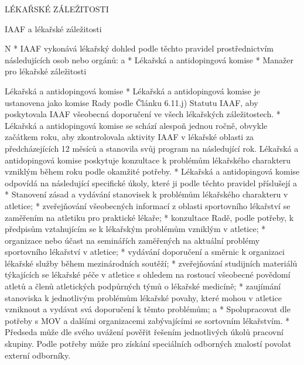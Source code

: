 \sec LÉKAŘSKÉ ZÁLEŽITOSTI

\secc IAAF a lékařské záležitosti

\begitems \style N
* IAAF vykonává lékařský dohled podle těchto pravidel prostřednictvím následujících osob nebo orgánů:
  \begitems \style a
  * Lékařská a antidopingová komise
  * Manažer pro lékařské záležitosti
  \enditems

Lékařská a antidopingová komise
* Lékařská a antidopingová komise je ustanovena jako komise Rady podle Článku 6.11.j) Statutu IAAF, aby poskytovala IAAF všeobecná doporučení ve všech  lékařských záležitostech.
* Lékařská a antidopingová komise se schází alespoň jednou ročně, obvykle začátkem roku, aby zkontrolovala aktivity IAAF v lékařské oblasti za předcházejících 12 měsíců a stanovila svůj program na následující rok. Lékařská a antidopingová komise poskytuje konzultace k problémům lékařského charakteru vzniklým během roku podle okamžité potřeby.
* Lékařská a antidopingová komise odpovídá na následující specifické úkoly, které ji podle těchto pravidel příslušejí
  \begitems \style a
  * Stanovení zásad a vydávání stanovisek k problémům lékařského charakteru v atletice;
  * zveřejňování všeobecných informací z oblasti sportovního lékařství se zaměřením na atletiku pro praktické lékaře;
  * konzultace Radě, podle potřeby, k předpisům vztahujícím se k  lékařským problémům vzniklým v atletice;
  * organizace nebo účast na seminářích zaměřených na aktuální problémy sportovního lékařství v atletice;
  * vydávání doporučení a směrnic k organizaci lékařské služby během mezinárodních soutěží;
  * zveřejňování studijních materiálů týkajících se lékařské péče v atletice s ohledem na rostoucí všeobecné povědomí atletů a členů atletických podpůrných týmů o lékařské medicíně;
  * zaujímání stanoviska k jednotlivým problémům lékařské povahy, které mohou v atletice vzniknout a vydávat svá doporučení k těmto problémům; a
  * Spolupracovat dle potřeby s MOV a dalšími organizacemi zabývajícími se sortovním lékařstvím.
  \enditems
* Předseda může dle svého uvážení pověřit řešením jednotlivých úkolů pracovní skupiny. Podle potřeby může pro získání speciálních odborných znalostí povolat externí odborníky.

